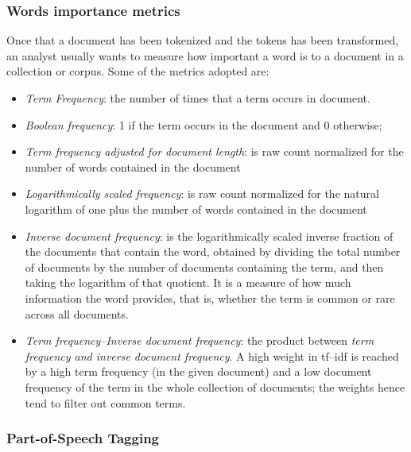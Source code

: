 \documentclass[]{book}
\providecommand{\tightlist}{%
  \setlength{\itemsep}{0pt}\setlength{\parskip}{0pt}}
\begin{document}
\subsubsection{Words importance metrics}\label{sotatoolstransformwi}

Once that a document has been tokenized and the tokens has been
transformed, an analyst usually wants to measure how important a word is
to a document in a collection or corpus. Some of the metrics adopted
are:

\begin{itemize}
\tightlist
\item
  \emph{Term Frequency}: the number of times that a term occurs in
  document.
\item
  \emph{Boolean frequency}: 1 if the term occurs in the document and 0
  otherwise;
\item
  \emph{Term frequency adjusted for document length}: is raw count
  normalized for the number of words contained in the document
\item
  \emph{Logarithmically scaled frequency}: is raw count normalized for
  the natural logarithm of one plus the number of words contained in the
  document
\item
  \emph{Inverse document frequency}: is the logarithmically scaled
  inverse fraction of the documents that contain the word, obtained by
  dividing the total number of documents by the number of documents
  containing the term, and then taking the logarithm of that quotient.
  It is a measure of how much information the word provides, that is,
  whether the term is common or rare across all documents.
\item
  \emph{Term frequency--Inverse document frequency}: the product between
  \emph{term frequency and inverse document frequency}. A high weight in
  tf--idf is reached by a high term frequency (in the given document)
  and a low document frequency of the term in the whole collection of
  documents; the weights hence tend to filter out common terms.
\end{itemize}

\subsubsection{Part-of-Speech Tagging}\label{sotatoolstransformpos}
\end{document}

